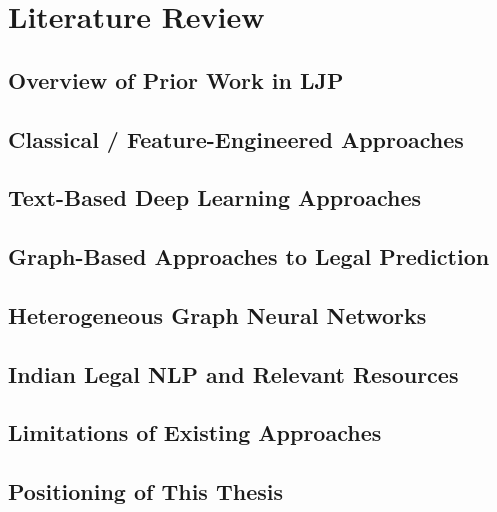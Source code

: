 \chapter{Literature Review}

\section{Overview of Prior Work in LJP}
\section{Classical / Feature-Engineered Approaches}
\section{Text-Based Deep Learning Approaches}
\section{Graph-Based Approaches to Legal Prediction}
\section{Heterogeneous Graph Neural Networks}
\section{Indian Legal NLP and Relevant Resources}
\section{Limitations of Existing Approaches}
\section{Positioning of This Thesis}

